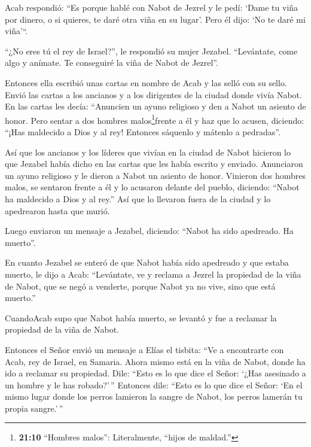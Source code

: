 Acab respondió: ``Es porque hablé con Nabot de Jezrel y le
pedí: `Dame tu viña por dinero, o si quieres, te daré otra viña en su
lugar'. Pero él dijo: `No te daré mi viña'``.

 ``¿No eres tú el rey de Israel?'', le respondió su mujer
Jezabel. ``Levántate, come algo y anímate. Te conseguiré la viña de
Nabot de Jezrel''.

 Entonces ella escribió unas cartas en nombre de Acab y las
selló con su sello. Envió las cartas a los ancianos y a los dirigentes
de la ciudad donde vivía Nabot.  En las cartas les decía:
``Anuncien un ayuno religioso y den a Nabot un asiento de honor.
 Pero sentar a dos hombres malos\footnote{\textbf{21:10}
  ``Hombres malos'': Literalmente, ``hijos de maldad.''}frente a él y
haz que lo acusen, diciendo: ``¡Has maldecido a Dios y al rey! Entonces
sáquenlo y mátenlo a pedradas''.

 Así que los ancianos y los líderes que vivían en la ciudad
de Nabot hicieron lo que Jezabel había dicho en las cartas que les había
escrito y enviado.  Anunciaron un ayuno religioso y le
dieron a Nabot un asiento de honor.  Vinieron dos hombres
malos, se sentaron frente a él y lo acusaron delante del pueblo,
diciendo: ``Nabot ha maldecido a Dios y al rey.'' Así que lo llevaron
fuera de la ciudad y lo apedrearon hasta que murió.

 Luego enviaron un mensaje a Jezabel, diciendo: ``Nabot ha
sido apedreado. Ha muerto''.

 En cuanto Jezabel se enteró de que Nabot había sido
apedreado y que estaba muerto, le dijo a Acab: ``Levántate, ve y reclama
a Jezrel la propiedad de la viña de Nabot, que se negó a venderte,
porque Nabot ya no vive, sino que está muerto.''

 CuandoAcab supo que Nabot había muerto, se levantó y fue a
reclamar la propiedad de la viña de Nabot.

 Entonces el Señor envió un mensaje a Elías el tisbita:
 ``Ve a encontrarte con Acab, rey de Israel, en Samaria.
Ahora mismo está en la viña de Nabot, donde ha ido a reclamar su
propiedad.  Dile: ``Esto es lo que dice el Señor: `¿Has
asesinado a un hombre y le has robado?'\,'' Entonces dile: ``Esto es lo
que dice el Señor: `En el mismo lugar donde los perros lamieron la
sangre de Nabot, los perros lamerán tu propia sangre.'\,''

